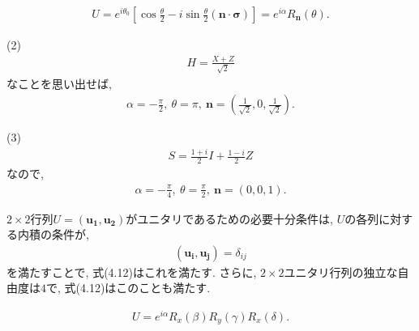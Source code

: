\begin{ex}
    \begin{align*}
        U = e^{i \theta_0}
        \left[ \cos\frac{\theta}{2} - i \sin\frac{\theta}{2} \left(\bm{n} \cdot \bm{\sigma}\right)
            \right]
        =  e^{i \alpha} R_{\bm{n}}(\theta).
    \end{align*}
    \par
    (2)\
    \begin{align*}
        H = \frac{X+Z}{\sqrt{2}}
    \end{align*}
    なことを思い出せば,
    \begin{align*}
        \alpha = - \frac{\pi}{2},\  \theta = \pi, \ \bm{n} =  \left( \frac{1}{\sqrt{2}},0,\frac{1}{\sqrt{2}} \right).
    \end{align*}
    \par
    (3)\
    \begin{align*}
        S = \frac{1+i}{2}I + \frac{1-i}{2}Z
    \end{align*}
    なので,
    \begin{align*}
        \alpha = - \frac{\pi}{4},\  \theta = \frac{\pi}{2}, \ \bm{n} =  \left( 0,0,1 \right).
    \end{align*}
\end{ex}

\begin{ex}
    \label{ex4.9}
    $2\times 2$行列$U = (\bm{u_1}, \bm{u_2})$がユニタリであるための必要十分条件は, $U$の各列に対する内積の条件が,
    \begin{align*}
        (\bm{u_i}, \bm{u_j}) = \delta_{ij}
    \end{align*}
    を満たすことで, 式(4.12)はこれを満たす. さらに, $2\times 2$ユニタリ行列の独立な自由度は$4$で, 式(4.12)はこのことも満たす.
\end{ex}

\begin{ex}
    \label{ex4.10}
    \begin{align*}
        U = e^{i\alpha} R_x(\beta) R_y(\gamma) R_x(\delta).
    \end{align*}
\end{ex}

